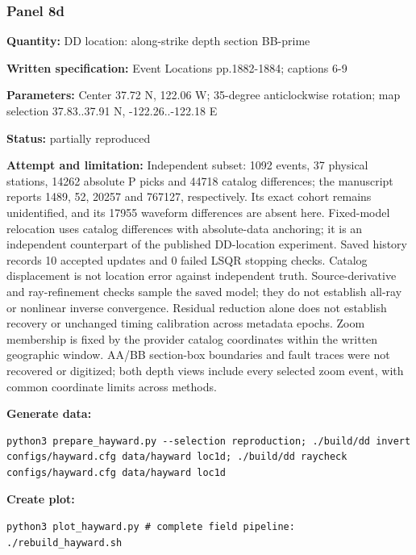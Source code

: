 \subsubsection*{Panel 8d}
\noindent\textbf{Quantity:} DD location: along-strike depth section BB-prime\par
\noindent\textbf{Written specification:} Event Locations pp.1882-1884; captions 6-9\par
\noindent\textbf{Parameters:} Center 37.72 N, 122.06 W; 35-degree anticlockwise rotation; map selection 37.83..37.91 N, -122.26..-122.18 E\par
\noindent\textbf{Status:} partially reproduced\par
\noindent\textbf{Attempt and limitation:} Independent subset: 1092 events, 37 physical stations, 14262 absolute P picks and 44718 catalog differences; the manuscript reports 1489, 52, 20257 and 767127, respectively. Its exact cohort remains unidentified, and its 17955 waveform differences are absent here. Fixed-model relocation uses catalog differences with absolute-data anchoring; it is an independent counterpart of the published DD-location experiment. Saved history records 10 accepted updates and 0 failed LSQR stopping checks. Catalog displacement is not location error against independent truth. Source-derivative and ray-refinement checks sample the saved model; they do not establish all-ray or nonlinear inverse convergence. Residual reduction alone does not establish recovery or unchanged timing calibration across metadata epochs. Zoom membership is fixed by the provider catalog coordinates within the written geographic window. AA/BB section-box boundaries and fault traces were not recovered or digitized; both depth views include every selected zoom event, with common coordinate limits across methods.\par
\noindent\textbf{Generate data:}
\begin{lstlisting}
python3 prepare_hayward.py --selection reproduction; ./build/dd invert configs/hayward.cfg data/hayward loc1d; ./build/dd raycheck configs/hayward.cfg data/hayward loc1d
\end{lstlisting}
\noindent\textbf{Create plot:}
\begin{lstlisting}
python3 plot_hayward.py # complete field pipeline: ./rebuild_hayward.sh
\end{lstlisting}
